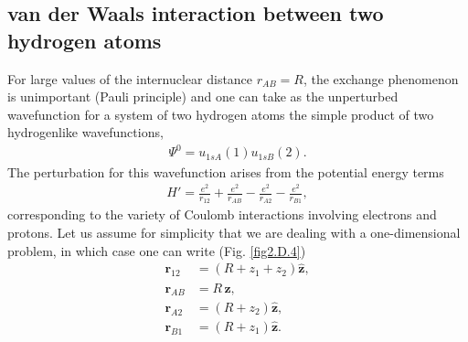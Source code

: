 \begin{subappendices}
\subsection{van der Waals interaction between two hydrogen atoms}
For large values of the internuclear distance $r_{AB}=R$, the exchange phenomenon is unimportant (Pauli principle) and one can take as the unperturbed wavefunction for a system of two hydrogen atoms  the simple product of two hydrogenlike wavefunctions,
\begin{align}\label{eq2.D.1}
\Psi^0=u_{1sA}(1)u_{1sB}(2).
\end{align}
The perturbation for this wavefunction arises from the potential energy terms
\begin{align}\label{eq2.D.2}
H'=\frac{e^2}{r_{12}}+\frac{e^2}{r_{AB}}-\frac{e^2}{r_{A2}}-\frac{e^2}{r_{B1}},
\end{align}
corresponding to the variety of Coulomb interactions involving electrons and protons. Let us assume for simplicity that we are dealing with a one-dimensional problem, in which case one can write (Fig. \ref{fig2.D.4})
\begin{align}\label{eq2.D.3}
\nonumber \mathbf r_{12}&=\left(R+z_1+z_2\right)\hat {\mathbf{z}},\\
\nonumber \mathbf r_{AB}&=R\,\hat {\mathbf{z}},\\
\nonumber \mathbf r_{A2}&=\left(R+z_2\right)\hat {\mathbf{z}},\\
\mathbf r_{B1}&=\left(R+z_1\right)\hat {\mathbf{z}}.
\end{align}


\end{subappendices}
